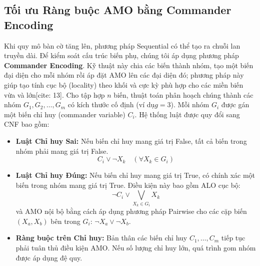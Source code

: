 \documentclass[a4paper,fleqn]{cas-sc}
\begin{document}
    \subsection{Tối ưu Ràng buộc AMO bằng Commander Encoding}\label{subsec:amo_cmd}
    Khi quy mô bàn cờ tăng lên, phương pháp Sequential có thể tạo ra chuỗi lan truyền dài. Để kiểm soát cấu trúc biến
    phụ, chúng tôi áp dụng phương pháp \textbf{Commander Encoding}. Kỹ thuật này chia các biến thành nhóm, tạo một biến
    đại diện cho mỗi nhóm rồi áp đặt AMO lên các đại diện đó; phương pháp này giúp tạo tính cục bộ (locality) theo
    khối và cực kỳ phù hợp cho các miền biến vừa và lớn[cite: 13]. Cho tập hợp $n$ biến, thuật toán phân hoạch chúng
    thành các nhóm $G_1, G_2, \dots, G_m$ có kích thước cố định (ví dụ$g = 3$). Mỗi nhóm $G_i$ được gán một biến chỉ huy
    (commander variable) $C_i$. Hệ thống luật được quy đổi sang CNF bao gồm:
    \begin{itemize}
        \item \textbf{Luật Chỉ huy Sai:}
        Nếu biến chỉ huy mang giá trị False, tất cả biến trong nhóm phải mang giá trị False.
        \begin{equation}
            C_i \lor \neg X_k \quad (\forall X_k \in G_i)
        \end{equation}
        \item \textbf{Luật Chỉ huy Đúng:}
        Nếu biến chỉ huy mang giá trị True, có chính xác một biến trong nhóm mang giá trị True. Điều kiện này bao gồm
        ALO cục bộ:
        \begin{equation}
            \neg C_i \lor \bigvee_{X_k \in G_i} X_k
        \end{equation}
        và AMO nội bộ bằng cách áp dụng phương pháp Pairwise cho các cặp biến $(X_a, X_b)$ bên trong $G_i$:
        $\neg X_a \lor \neg X_b$.
        \item \textbf{Ràng buộc trên Chỉ huy:} Bản thân các biến chỉ huy $C_1, \dots, C_m$
        tiếp tục phải tuân thủ điều kiện AMO. Nếu số lượng chỉ huy lớn, quá trình gom nhóm được áp dụng đệ quy.
    \end{itemize}
\end{document}
